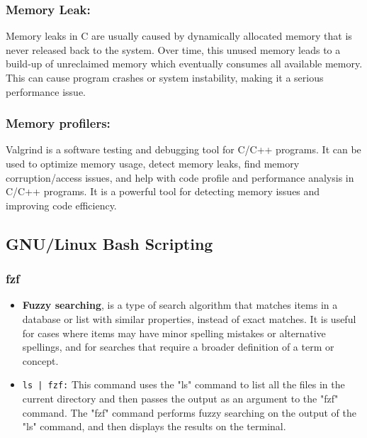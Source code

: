 \documentclass[12pt]{article}
\begin{document}
    \subsubsection{Memory Leak:}
        Memory leaks in C are usually caused by dynamically allocated memory that is never released back to the system. Over time, this unused memory leads to a build-up of unreclaimed memory which eventually consumes all available memory. This can cause program crashes or system instability, making it a serious performance issue.
    \subsubsection{Memory profilers:}
        Valgrind is a software testing and debugging tool for C/C++ programs. It can be used to optimize memory usage, detect memory leaks, find memory corruption/access issues, and help with code profile and performance analysis in C/C++ programs. It is a powerful tool for detecting memory issues and improving code efficiency.

\subsection{GNU/Linux Bash Scripting}
\subsubsection{fzf}
    \begin{itemize}
        \item \textbf{Fuzzy searching}, is a type of search algorithm that matches items in a database or list with similar properties, instead of exact matches. It is useful for cases where items may have minor spelling mistakes or alternative spellings, and for searches that require a broader definition of a term or concept. 
        \item \texttt{ls | fzf:} This command uses the "ls" command to list all the files in the current directory and then passes the output as an argument to the "fzf" command. The "fzf" command performs fuzzy searching on the output of the "ls" command, and then displays the results on the terminal.
    \end{itemize}
\end{document}
